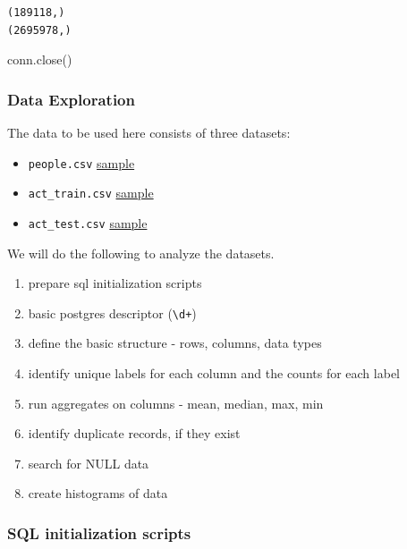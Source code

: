 \documentclass[]{report}
\newenvironment{Shaded}{}{}
\newcommand{\NormalTok}[1]{{#1}}
\begin{document}
\begin{verbatim}
(189118,)
(2695978,)
\end{verbatim}

\begin{Shaded}
\begin{Highlighting}[]
\NormalTok{conn.close()}
\end{Highlighting}
\end{Shaded}

\subsubsection{Data Exploration}\label{data-exploration}

The data to be used here consists of three datasets:

\begin{itemize}
\itemsep1pt\parskip0pt
\item
  \texttt{people.csv}
  \href{https://github.com/joshuacook/redhat/blob/master/data/people_head.csv}{sample}
\item
  \texttt{act\_train.csv}
  \href{https://github.com/joshuacook/redhat/blob/master/data/act_train_head.csv}{sample}
\item
  \texttt{act\_test.csv}
  \href{https://github.com/joshuacook/redhat/blob/master/data/act_test_head.csv}{sample}
\end{itemize}

We will do the following to analyze the datasets.

\begin{enumerate}
\def\labelenumi{\arabic{enumi}.}
\itemsep1pt\parskip0pt
\item
  prepare sql initialization scripts
\item
  basic postgres descriptor (\texttt{\textbackslash{}d+})
\item
  define the basic structure - rows, columns, data types
\item
  identify unique labels for each column and the counts for each label
\item
  run aggregates on columns - mean, median, max, min
\item
  identify duplicate records, if they exist
\item
  search for NULL data
\item
  create histograms of data
\end{enumerate}

\subsubsection{SQL initialization
scripts}\label{sql-initialization-scripts}
\end{document}
